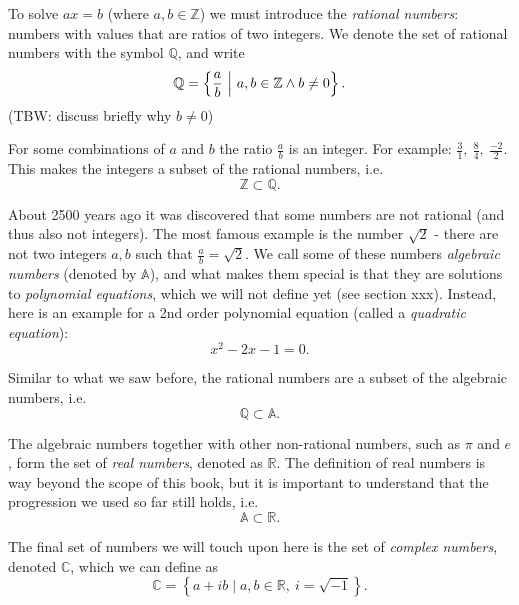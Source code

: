 To solve $ax=b$ (where $a,b\in\mathbb{Z}$) we must introduce the \emph{rational numbers}: numbers with values that are ratios of two integers. We denote the set of rational numbers with the symbol $\mathbb{Q}$, and write
\begin{equation}
	\mathbb{Q} = \left\{ \frac{a}{b} \ \middle\vert\ a,b\in\mathbb{Z} \wedge b\neq0  \right\}.
	\label{eq:rationals}
\end{equation}
(TBW: discuss briefly why $b\neq0$)

For some combinations of $a$ and $b$ the ratio $\frac{a}{b}$ is an integer. For example: $\frac{3}{1},\ \frac{8}{4},\ \frac{-2}{2}$. This makes the integers a subset of the rational numbers, i.e.
\begin{equation}
	\mathbb{Z}\subset\mathbb{Q}.
	\label{eq:integers_subset_rationals}
\end{equation}

About 2500 years ago it was discovered that some numbers are not rational (and thus also not integers). The most famous example is the number $\sqrt{2}$ - there are not two integers $a,b$ such that $\frac{a}{b}=\sqrt{2}$. We call some of these numbers \emph{algebraic numbers} (denoted by $\mathbb{A}$), and what makes them special is that they are solutions to \emph{polynomial equations}, which we will not define yet (see section xxx). Instead, here is an example for a 2nd order polynomial equation (called a \emph{quadratic equation}):
\begin{equation}
	x^{2} - 2x - 1 = 0.
	\label{eq:quadratic_equation}
\end{equation}

Similar to what we saw before, the rational numbers are a subset of the algebraic numbers, i.e.
\begin{equation}
	\mathbb{Q}\subset\mathbb{A}.
	\label{eq:rationals_subset_algebraic}
\end{equation}

The algebraic numbers together with other non-rational numbers, such as $\pi$ and $e$, form the set of \emph{real numbers}, denoted as $\mathbb{R}$. The definition of real numbers is way beyond the scope of this book, but it is important to understand that the progression we used so far still holds, i.e.
\begin{equation}
	\mathbb{A}\subset\mathbb{R}.
	\label{eq:algebraic_subset_reals}
\end{equation}

The final set of numbers we will touch upon here is the set of \emph{complex numbers}, denoted $\mathbb{C}$, which we can define as
\begin{equation}
	\mathbb{C} = \left\{ a+ib \mid a,b\in\mathbb{R},\ i=\sqrt{-1} \right\}.
	\label{eq:complex_numbers_def}
\end{equation}

